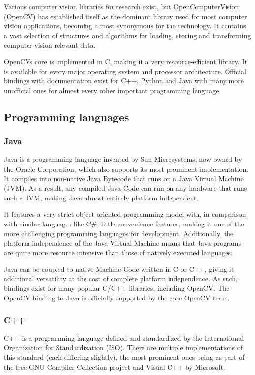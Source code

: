 \documentclass[BSA,Bachelor,english]{twbook}%
\begin{document}
Various computer vision libraries for research exist, but OpenComputerVision (OpenCV) has established itself as the dominant library used for most computer vision applications, becoming almost synonymous for the technology. It contains a vast selection of structures and algorithms for loading, storing and transforming computer vision relevant data.

OpenCVs core is implemented in C, making it a very resource-efficient library. It is available for every major operating system and processor architecture. Official bindings with documentation exist for C++, Python and Java with many more unofficial ones for almost every other important programming language.

\subsection{Programming languages}
\subsubsection{Java}
Java\cite{JAVA} is a programming language invented by Sun Microsystems, now owned by the Oracle Corporation, which also supports its most prominent implementation. It compiles into non-native Java Bytecode that runs on a Java Virtual Machine (JVM). As a result, any compiled Java Code can run on any hardware that runs such a JVM, making Java almost entirely platform independent.

It features a very strict object oriented programming model with, in comparison with similar languages like C\#, little convenience features, making it one of the more challenging programming languages for development. Additionally, the platform independence of the Java Virtual Machine means that Java programs are quite more resource intensive than those of natively executed languages\cite{SPD_COMPARISON}.

Java can be coupled to native Machine Code written in C or C++, giving it additional versatility at the cost of complete platform independence. As such, bindings exist for many popular C/C++ libraries, including OpenCV. The OpenCV binding to Java is officially supported by the core OpenCV team.
\subsubsection{C++}
C++ is a programming language defined and standardized by the International Organization for Standardization (ISO)\cite{CPP}. There are multiple implementations of this standard (each differing slightly), the most prominent ones being as part of the free GNU Compiler Collection project and Visual C++ by Microsoft.
\end{document}
